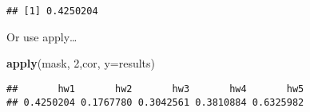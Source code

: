 \documentclass[
]{article}
\newenvironment{Shaded}{\begin{snugshade}}{\end{snugshade}}
\newcommand{\DataTypeTok}[1]{\textcolor[rgb]{0.13,0.29,0.53}{#1}}
\newcommand{\DecValTok}[1]{\textcolor[rgb]{0.00,0.00,0.81}{#1}}
\newcommand{\KeywordTok}[1]{\textcolor[rgb]{0.13,0.29,0.53}{\textbf{#1}}}
\newcommand{\NormalTok}[1]{#1}
\begin{document}
\begin{verbatim}
## [1] 0.4250204
\end{verbatim}

Or use apply\ldots{}

\begin{Shaded}
\begin{Highlighting}[]
\KeywordTok{apply}\NormalTok{(mask, }\DecValTok{2}\NormalTok{,cor, }\DataTypeTok{y=}\NormalTok{results)}
\end{Highlighting}
\end{Shaded}

\begin{verbatim}
##       hw1       hw2       hw3       hw4       hw5 
## 0.4250204 0.1767780 0.3042561 0.3810884 0.6325982
\end{verbatim}
\end{document}
